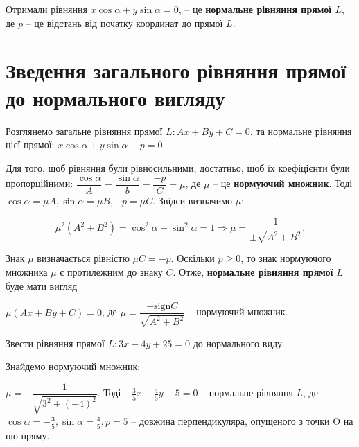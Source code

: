     Отримали рівняння
    $x\cos\alpha + y\sin\alpha = 0$,	
    -- це \textbf{нормальне рівняння прямої $L$}, де $p$ -- це відстань від початку
    координат до прямої $L$.

\section{Зведення загального рівняння прямої до нормального вигляду}

Розглянемо загальне рівняння прямої $L: Ax + By + C= 0$, та нормальне
рівняння цієї прямої: $x\cos\alpha + y\sin\alpha - p = 0$.

Для того, щоб рівняння були рівносильними, достатньо, щоб їх коефіцієнти
були пропорційними: $\dfrac{\cos\alpha}{A} = \dfrac{\sin\alpha}{b} = \dfrac{-p}{C} = \mu$, де $\mu$ -- це
\textbf{нормуючий множник}. Тоді $\cos\alpha = \mu A, \sin\alpha = \mu B, -p = \mu C$. Звідси визначимо $\mu$:

$$\mu^2(A^2 + B^2) = \cos^2\alpha + \sin^2\alpha = 1 \Rightarrow \mu = \dfrac{1}{\pm\sqrt{A^2 + B^2}}.$$

Знак $\mu$ визначається рівністю $\mu C = -p$. Оскільки $p \geq 0$, то знак нормуючого
множника $\mu$ є протилежним до знаку $C$. Отже, \textbf{нормальне рівняння прямої} $L$ буде
мати вигляд

$\mu(Ax+By+C) = 0$, де $\mu = \dfrac{-\text{sign} C}{\sqrt{A^2 + B^2}}$ -- нормуючий множник.

\begin{example}
	Звести рівняння прямої $L : 3x-4y+25 = 0$ до нормального виду.
\end{example}
\begin{solution}
	Знайдемо нормуючий множник:

	$\mu = -\dfrac{1}{\sqrt{3^2 + (-4)^2}}$.
	Тоді $-\frac{3}{5} x + \frac{4}{5} y - 5 = 0$ -- нормальне рівняння $L$, де
	$\cos\alpha = -\frac{3}{5}, \sin\alpha = \frac{4}{5}, p = 5$ -- довжина перпендикуляра,
	опущеного з точки O на цю пряму. 
\end{solution}

